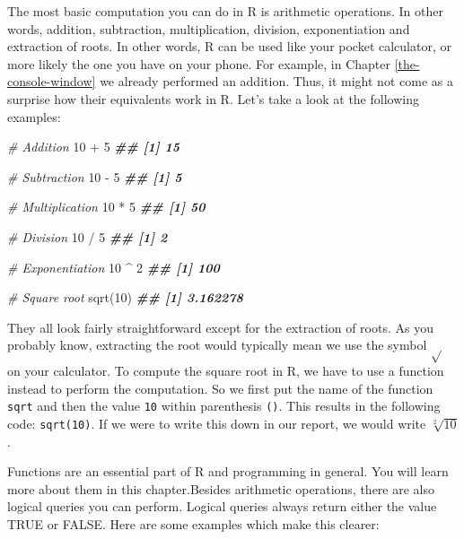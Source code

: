 \documentclass[
]{book}
\newenvironment{Shaded}{\begin{snugshade}}{\end{snugshade}}
\newcommand{\CommentTok}[1]{\textcolor[rgb]{0.56,0.35,0.01}{\textit{#1}}}
\newcommand{\DecValTok}[1]{\textcolor[rgb]{0.00,0.00,0.81}{#1}}
\newcommand{\DocumentationTok}[1]{\textcolor[rgb]{0.56,0.35,0.01}{\textbf{\textit{#1}}}}
\newcommand{\FunctionTok}[1]{\textcolor[rgb]{0.00,0.00,0.00}{#1}}
\newcommand{\NormalTok}[1]{#1}
\newcommand{\SpecialCharTok}[1]{\textcolor[rgb]{0.00,0.00,0.00}{#1}}
\begin{document}
The most basic computation you can do in R is arithmetic operations. In other words, addition, subtraction, multiplication, division, exponentiation and extraction of roots. In other words, R can be used like your pocket calculator, or more likely the one you have on your phone. For example, in Chapter \ref{the-console-window} we already performed an addition. Thus, it might not come as a surprise how their equivalents work in R. Let's take a look at the following examples:

\begin{Shaded}
\begin{Highlighting}[]
\CommentTok{\# Addition}
\DecValTok{10} \SpecialCharTok{+} \DecValTok{5}
\DocumentationTok{\#\# [1] 15}

\CommentTok{\# Subtraction}
\DecValTok{10} \SpecialCharTok{{-}} \DecValTok{5}
\DocumentationTok{\#\# [1] 5}

\CommentTok{\# Multiplication}
\DecValTok{10} \SpecialCharTok{*} \DecValTok{5}
\DocumentationTok{\#\# [1] 50}

\CommentTok{\# Division}
\DecValTok{10} \SpecialCharTok{/} \DecValTok{5}
\DocumentationTok{\#\# [1] 2}

\CommentTok{\# Exponentiation}
\DecValTok{10} \SpecialCharTok{\^{}} \DecValTok{2}
\DocumentationTok{\#\# [1] 100}

\CommentTok{\# Square root}
\FunctionTok{sqrt}\NormalTok{(}\DecValTok{10}\NormalTok{)}
\DocumentationTok{\#\# [1] 3.162278}
\end{Highlighting}
\end{Shaded}

They all look fairly straightforward except for the extraction of roots. As you probably know, extracting the root would typically mean we use the symbol \(\sqrt{}\) on your calculator. To compute the square root in R, we have to use a function instead to perform the computation. So we first put the name of the function \texttt{sqrt} and then the value \texttt{10} within parenthesis \texttt{()}. This results in the following code: \texttt{sqrt(10)}. If we were to write this down in our report, we would write \(\sqrt[2]{10}\).

Functions are an essential part of R and programming in general. You will learn more about them in this chapter.Besides arithmetic operations, there are also logical queries you can perform. Logical queries always return either the value TRUE or FALSE. Here are some examples which make this clearer:
\end{document}
